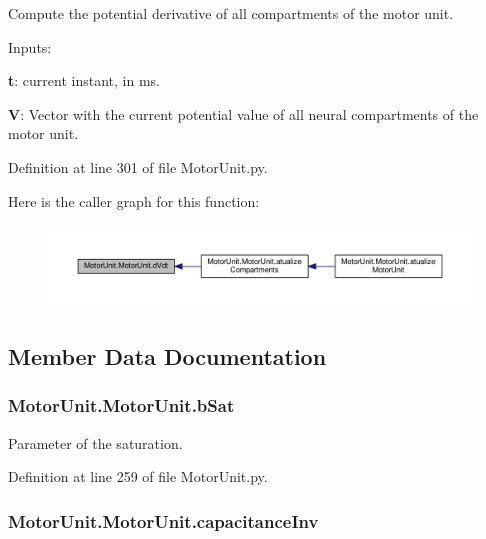Compute the potential derivative of all compartments of the motor unit. 


\begin{DoxyItemize}
\item Inputs\-:
\begin{DoxyItemize}
\item {\bfseries t}\-: current instant, in ms.
\item {\bfseries V}\-: Vector with the current potential value of all neural compartments of the motor unit. 
\end{DoxyItemize}
\end{DoxyItemize}

Definition at line 301 of file Motor\-Unit.\-py.



Here is the caller graph for this function\-:\nopagebreak
\begin{figure}[H]
\begin{center}
\leavevmode
\includegraphics[width=350pt]{class_motor_unit_1_1_motor_unit_af694436ac5bd3194cfcbe42b8a60180d_icgraph}
\end{center}
\end{figure}




\subsection{Member Data Documentation}
\hypertarget{class_motor_unit_1_1_motor_unit_a2256c241b36e0181e3530e6f791545a0}{
\subsubsection[{b\-Sat}]{\setlength{\rightskip}{0pt plus 5cm}Motor\-Unit.\-Motor\-Unit.\-b\-Sat}}\label{class_motor_unit_1_1_motor_unit_a2256c241b36e0181e3530e6f791545a0}


Parameter of the saturation. 



Definition at line 259 of file Motor\-Unit.\-py.

\hypertarget{class_motor_unit_1_1_motor_unit_a0cf2afb5bd12374db56b9d9a5a1671e6}{
\subsubsection[{capacitance\-Inv}]{\setlength{\rightskip}{0pt plus 5cm}Motor\-Unit.\-Motor\-Unit.\-capacitance\-Inv}}\label{class_motor_unit_1_1_motor_unit_a0cf2afb5bd12374db56b9d9a5a1671e6}


